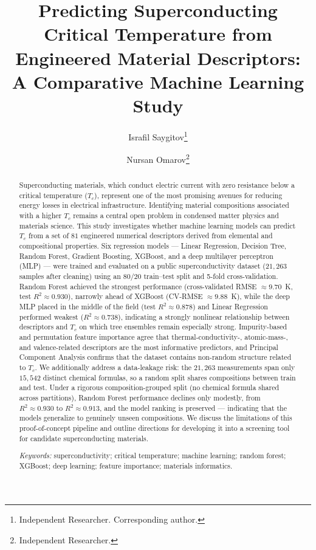 \documentclass[11pt]{article}
\title{\vspace{-1.5em}\bfseries\color{headingblue}\Large
Predicting Superconducting Critical Temperature from Engineered
Material Descriptors: A Comparative Machine Learning Study}
\author{
Israfil Saygitov\thanks{Independent Researcher. Corresponding author.}
\and
Nursan Omarov\thanks{Independent Researcher.}
}
\date{}
\begin{document}
\maketitle

\begin{abstract}
\noindent
Superconducting materials, which conduct electric current with zero resistance below a critical
temperature ($T_c$), represent one of the most promising avenues for reducing energy losses in
electrical infrastructure. Identifying material compositions associated with a higher $T_c$ remains a
central open problem in condensed matter physics and materials science. This study investigates whether
machine learning models can predict $T_c$ from a set of $81$ engineered numerical descriptors derived
from elemental and compositional properties. Six regression models --- Linear Regression, Decision Tree,
Random Forest, Gradient Boosting, XGBoost, and a deep multilayer perceptron (MLP) --- were trained and
evaluated on a public superconductivity dataset ($21{,}263$ samples after cleaning) using an 80/20
train--test split and 5-fold cross-validation. Random Forest achieved the strongest performance
(cross-validated RMSE $\approx 9.70$~K, test $R^2 \approx 0.930$), narrowly ahead of XGBoost
(CV-RMSE $\approx 9.88$~K), while the deep MLP placed in the middle of the field
(test $R^2 \approx 0.878$) and Linear Regression performed weakest ($R^2 \approx 0.738$), indicating a
strongly nonlinear relationship between descriptors and $T_c$ on which tree ensembles remain especially
strong. Impurity-based and permutation feature importance agree that thermal-conductivity-,
atomic-mass-, and valence-related descriptors are the most informative predictors, and Principal
Component Analysis confirms that the dataset contains non-random structure related to $T_c$. We
additionally address a data-leakage risk: the $21{,}263$ measurements span only $15{,}542$ distinct chemical
formulas, so a random split shares compositions between train and test. Under a rigorous composition-grouped
split (no chemical formula shared across partitions), Random Forest performance declines only modestly, from
$R^2 \approx 0.930$ to $R^2 \approx 0.913$, and the model ranking is preserved --- indicating that the
models generalize to genuinely unseen compositions. We discuss the limitations of this proof-of-concept
pipeline and outline directions for developing it into a screening tool for candidate superconducting
materials.

\vspace{0.6em}
\noindent\textit{Keywords:} superconductivity; critical temperature; machine learning; random forest;
XGBoost; deep learning; feature importance; materials informatics.
\end{abstract}
\end{document}
